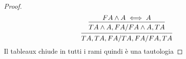 \begin{proof}
\begin{equation*}
\begin{prooftree}
\hypo{F A \land A \iff A}
\infer1 {T A \land A,FA / F A \land A,TA}
\infer1 {TA,TA,FA/TA,FA/FA,TA}
\end{prooftree}
\end{equation*}
Il tableaux chiude in tutti i rami quindi è una tautologia
\end{proof}
